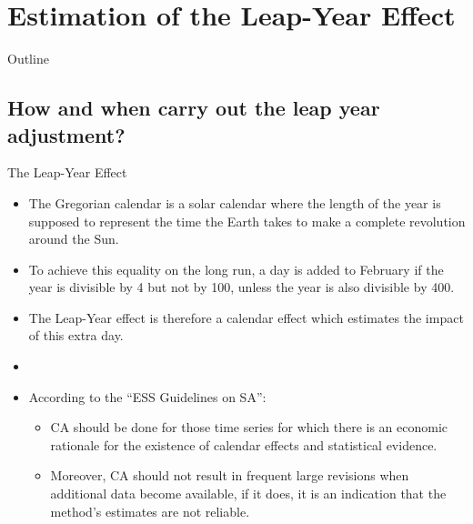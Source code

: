 \documentclass[10pt]{beamer}
\begin{document}

\section{Estimation of the Leap-Year Effect}
\begin{frame}{Outline}
\end{frame}

\subsection{How and when carry out the leap year
adjustment?}

\begin{frame}{The Leap-Year Effect}
 \begin{itemize}
  \item The Gregorian calendar is a solar calendar where the length of the year is supposed to represent the time the Earth takes to make a complete revolution around the Sun. 
	\item To achieve this equality on the long run, a day is added to February if the year is divisible by 4 but not by 100, unless the year is also divisible by 400.
  \item The Leap-Year effect is therefore a calendar effect which estimates the impact of this extra day.
	\item[]
	\item According to the ``ESS Guidelines on SA'':
    \begin{itemize}
	     \item CA should be done for those time series for which there is an economic rationale for the existence of calendar effects and statistical evidence. 
	     \item Moreover, CA should not result in frequent large revisions when additional data become available, if it does, it is an indication that the method's estimates are not reliable.
    \end{itemize}
 \end{itemize}
\end{frame}
\end{document}
